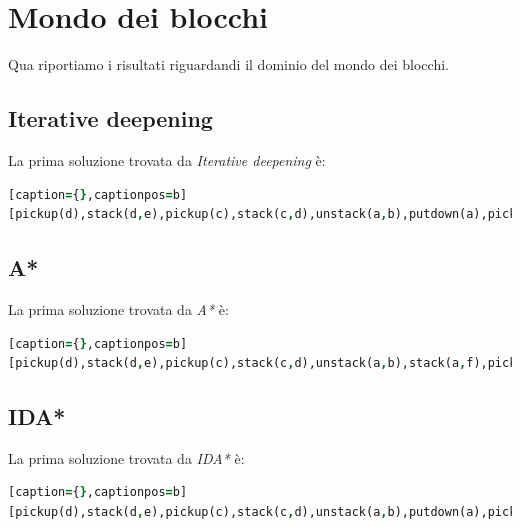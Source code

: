 \documentclass[12pt]{report}
\begin{document}
\section{Mondo dei blocchi}
Qua riportiamo i risultati riguardandi il dominio del mondo dei blocchi.

\subsection{Iterative deepening}
La prima soluzione trovata da \emph{Iterative deepening} è:

\begin{lstlisting}[language=Prolog][caption={},captionpos=b]
[pickup(d),stack(d,e),pickup(c),stack(c,d),unstack(a,b),putdown(a),pickup(b),stack(b,c),pickup(a),stack(a,b)]
\end{lstlisting}

\subsection{A*}
La prima soluzione trovata da \emph{A*} è:

\begin{lstlisting}[language=Prolog][caption={},captionpos=b]
[pickup(d),stack(d,e),pickup(c),stack(c,d),unstack(a,b),stack(a,f),pickup(b),stack(b,c),unstack(a,f),stack(a,b)]
\end{lstlisting}

\subsection{IDA*}
La prima soluzione trovata da \emph{IDA*} è:

\begin{lstlisting}[language=Prolog][caption={},captionpos=b]
[pickup(d),stack(d,e),pickup(c),stack(c,d),unstack(a,b),putdown(a),pickup(b),stack(b,c),pickup(a),stack(a,b)]
\end{lstlisting}
\end{document}
